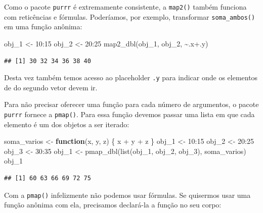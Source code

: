 \documentclass[
]{book}
\newenvironment{Shaded}{\begin{snugshade}}{\end{snugshade}}
\newcommand{\ControlFlowTok}[1]{\textcolor[rgb]{0.13,0.29,0.53}{\textbf{#1}}}
\newcommand{\DecValTok}[1]{\textcolor[rgb]{0.00,0.00,0.81}{#1}}
\newcommand{\FunctionTok}[1]{\textcolor[rgb]{0.00,0.00,0.00}{#1}}
\newcommand{\NormalTok}[1]{#1}
\newcommand{\OtherTok}[1]{\textcolor[rgb]{0.56,0.35,0.01}{#1}}
\newcommand{\SpecialCharTok}[1]{\textcolor[rgb]{0.00,0.00,0.00}{#1}}
\begin{document}
Como o pacote \texttt{purrr} é extremamente consistente, a \texttt{map2()} também funciona com
reticências e fórmulas. Poderíamos, por exemplo, transformar \texttt{soma\_ambos()} em
uma função anônima:

\begin{Shaded}
\begin{Highlighting}[]
\NormalTok{obj\_1 }\OtherTok{\textless{}{-}} \DecValTok{10}\SpecialCharTok{:}\DecValTok{15}
\NormalTok{obj\_2 }\OtherTok{\textless{}{-}} \DecValTok{20}\SpecialCharTok{:}\DecValTok{25}
\FunctionTok{map2\_dbl}\NormalTok{(obj\_1, obj\_2, }\SpecialCharTok{\textasciitilde{}}\NormalTok{.x}\SpecialCharTok{+}\NormalTok{.y)}
\end{Highlighting}
\end{Shaded}

\begin{verbatim}
## [1] 30 32 34 36 38 40
\end{verbatim}

Desta vez também temos acesso ao placeholder \texttt{.y} para indicar onde os elementos
de do segundo vetor devem ir.

Para não precisar oferecer uma função para cada número de argumentos, o pacote
\texttt{purrr} fornece a \texttt{pmap()}. Para essa função devemos passar uma lista em que cada
elemento é um dos objetos a ser iterado:

\begin{Shaded}
\begin{Highlighting}[]
\NormalTok{soma\_varios }\OtherTok{\textless{}{-}} \ControlFlowTok{function}\NormalTok{(x, y, z) \{ x }\SpecialCharTok{+}\NormalTok{ y }\SpecialCharTok{+}\NormalTok{ z \}}
\NormalTok{obj\_1 }\OtherTok{\textless{}{-}} \DecValTok{10}\SpecialCharTok{:}\DecValTok{15}
\NormalTok{obj\_2 }\OtherTok{\textless{}{-}} \DecValTok{20}\SpecialCharTok{:}\DecValTok{25}
\NormalTok{obj\_3 }\OtherTok{\textless{}{-}} \DecValTok{30}\SpecialCharTok{:}\DecValTok{35}
\NormalTok{obj\_1 }\OtherTok{\textless{}{-}} \FunctionTok{pmap\_dbl}\NormalTok{(}\FunctionTok{list}\NormalTok{(obj\_1, obj\_2, obj\_3), soma\_varios)}
\NormalTok{obj\_1}
\end{Highlighting}
\end{Shaded}

\begin{verbatim}
## [1] 60 63 66 69 72 75
\end{verbatim}

Com a \texttt{pmap()} infelizmente não podemos usar fórmulas. Se quisermos usar uma
função anônima com ela, precisamos declará-la a função no seu corpo:
\end{document}
